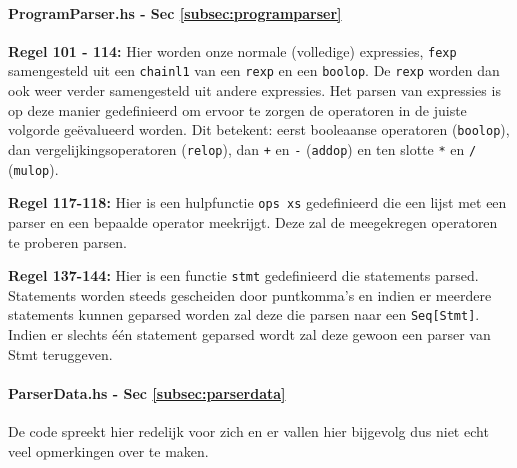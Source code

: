 \documentclass[12pt, titlepage]{article}
\begin{document}
\paragraph{ProgramParser.hs - Sec \ref{subsec:programparser}}
\begin{description}

\item{\bf Regel 101 - 114:} Hier worden onze normale (volledige) expressies, \texttt{fexp} samengesteld uit een \texttt{chainl1} van een \texttt{rexp} en een \texttt{boolop}. De \texttt{rexp} worden dan ook weer verder samengesteld uit andere expressies. Het parsen van expressies is op deze manier gedefinieerd om ervoor te zorgen de operatoren in de juiste volgorde geëvalueerd worden. Dit betekent: eerst booleaanse operatoren (\texttt{boolop}), dan vergelijkingsoperatoren (\texttt{relop}), dan \texttt{+} en \texttt{-} (\texttt{addop}) en ten slotte \texttt{*} en \texttt{/} (\texttt{mulop}).
\newline
\item{\bf Regel 117-118:} Hier is een hulpfunctie \texttt{ops xs} gedefinieerd die een lijst met een parser en een bepaalde operator meekrijgt. Deze zal de meegekregen operatoren te proberen parsen.
\newline
\item{\bf Regel 137-144:} Hier is een functie \texttt{stmt} gedefinieerd die statements parsed. Statements worden steeds gescheiden door puntkomma's en indien er meerdere statements kunnen geparsed worden zal deze die parsen naar een \texttt{Seq[Stmt]}. Indien er slechts één statement geparsed wordt zal deze gewoon een parser van Stmt teruggeven.
\end{description}

\paragraph{ParserData.hs - Sec \ref{subsec:parserdata}}
De code spreekt hier redelijk voor zich en er vallen hier bijgevolg dus niet echt veel opmerkingen over te maken.
\end{document}
